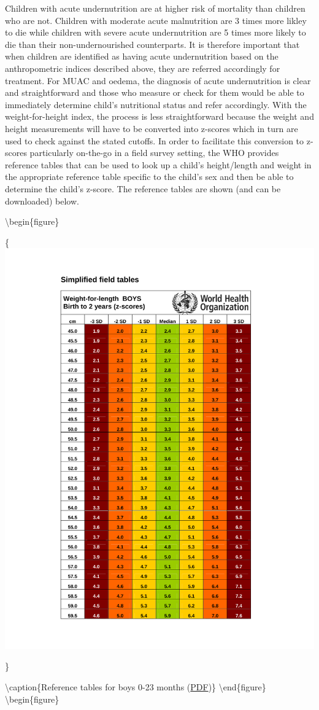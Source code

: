 \documentclass[12pt,]{book}
\theoremstyle{definition}
\theoremstyle{definition}
\theoremstyle{definition}
\theoremstyle{remark}
\begin{document}
Children with acute undernutrition are at higher risk of mortality than
children who are not. Children with moderate acute malnutrition are 3
times more likley to die while children with severe acute undernutrition
are 5 times more likely to die than their non-undernourished
counterparts. It is therefore important that when children are
identified as having acute undernutrition based on the anthropometric
indices described above, they are referred accordingly for treatment.
For MUAC and oedema, the diagnosis of acute undernutrition is clear and
straightforward and those who measure or check for them would be able to
immediately determine child's nutritional status and refer accordingly.
With the weight-for-height index, the process is less straightforward
because the weight and height measurements will have to be converted
into z-scores which in turn are used to check against the stated
cutoffs. In order to facilitate this conversion to z-scores particularly
on-the-go in a field survey setting, the WHO provides reference tables
that can be used to look up a child's height/length and weight in the
appropriate reference table specific to the child's sex and then be able
to determine the child's z-score. The reference tables are shown (and
can be downloaded) below.

\textbackslash{}begin\{figure\}

\{\centering \includegraphics[width=0.5\linewidth]{pdf/boys_0_24}

\}

\textbackslash{}caption\{Reference tables for boys 0-23 months
(\href{'pdf/boys_0_24.pdf'}{PDF})\}\label{fig:anthro11}
\textbackslash{}end\{figure\} \textbackslash{}begin\{figure\}
\end{document}

